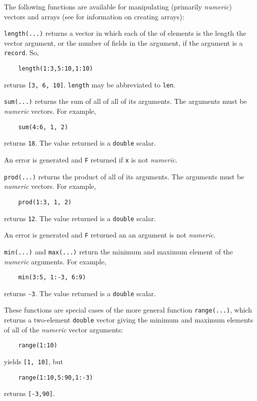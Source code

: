 The following functions are available for manipulating
(primarily {\em numeric}) vectors and arrays (see 
for information on creating arrays):
\begin{sloppy}
\begin{list}{}{}

\item[{\tt length(...)}] \label{length-func} 
returns a vector in which each of the of elements is the length the vector argument,
or the number of fields in the argument, if the argument is a {\tt record}.  So,
\begin{verbatim}
    length(1:3,5:10,1:10)
\end{verbatim}
returns {\tt [3, 6, 10]}. {\tt length} may be abbreviated to {\tt len}.
\label{len-func}

\item[{\tt sum(...)}] \label{sum-func} 
returns the sum of all of all of its arguments. The arguments
must be {\em numeric} vectors.  For example,
\begin{verbatim}
    sum(4:6, 1, 2)
\end{verbatim}
returns {\tt 18}. The value returned is a {\tt double} scalar.

An error is generated and {\tt F} returned if {\tt x} is not {\em numeric\/}.

\item[{\tt prod(...)}] \label{prod-func} 
returns the product of all of its arguments. The arguments
must be {\em numeric} vectors.  For example,
\begin{verbatim}
    prod(1:3, 1, 2)
\end{verbatim}
returns {\tt 12}. The value returned is a {\tt double} scalar.

An error is generated and {\tt F} returned an an argument is not {\em numeric\/}.

 
\item[{\tt min(...)}] \label{min-func} and {\tt max(...)} \label{max-func}
return the minimum and maximum element
of the {\em numeric} arguments. For example,
\begin{verbatim}
    min(3:5, 1:-3, 6:9)
\end{verbatim}
returns {\tt -3}. The value returned is a {\tt double} scalar.

These functions are special cases of the more general function {\tt range(...)},
\label{range-func}
which returns a two-element {\tt double} vector giving the minimum and
maximum elements of all of the {\em numeric} vector arguments:
\begin{verbatim}
    range(1:10)
\end{verbatim}
yields {\tt [1, 10]}, but
\begin{verbatim}
    range(1:10,5:90,1:-3)
\end{verbatim}
returns {\tt [-3,90]}.


\end{list}
\end{sloppy}
